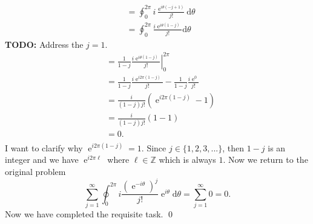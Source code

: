 \documentclass[10pt]{amsart}
\newcommand{\D}{\mathrm{d}}
\DeclareMathOperator{\E}{e}
\theoremstyle{nonumberplain}
\begin{document}
\begin{enumerate}[label={\bf {\arabic*}:}]
\begin{align*}
	&=\oint_0^{2\pi} i \frac{\E^{i\theta\left( - j + 1\right)}}{j!} \D \theta \\
	&=\oint_0^{2\pi} \frac{i\E^{i\theta\left(1 - j\right)}}{j!} \D \theta
\end{align*}
\textbf{TODO:} Address the $j = 1$.
\begin{align*}
	&= \left. \frac{1}{1 - j} \frac{i\E^{i\theta\left(1 - j\right)}}{j!} \right|_0^{2 \pi} \\
	&= \frac{1}{1 - j} \frac{i\E^{i2\pi\left(1 - j\right)}}{j!} - \frac{1}{1 - j} \frac{i\E^0}{j!} \\
	&= \frac{i}{\left(1 - j\right)j!}\left(\E^{i2\pi\left(1 - j\right)} - 1 \right) \\
	&= \frac{i}{\left(1 - j\right)j!}\left(1 - 1 \right) \\
	&= 0. \\
\end{align*}
I want to clarify why $\E^{i2\pi\left(1 - j\right)} = 1$.
Since $j \in \{1, 2, 3, ...\}$, then $1 - j$ is an integer and we have $\E^{i2\pi \ell}$ where $\ell \in \mathbb Z$ which is always $1$.
Now we return to the original problem
$$
\sum_{j=1}^{\infty} \oint_0^{2\pi} i \frac{\left(\E^{-i\theta}\right)^j}{j!} {\E^{i\theta}} \D \theta = \sum_{j=1}^{\infty} 0 = 0.
$$
Now we have completed the requisite task.
\qed
\\


\end{enumerate}
\end{document}
